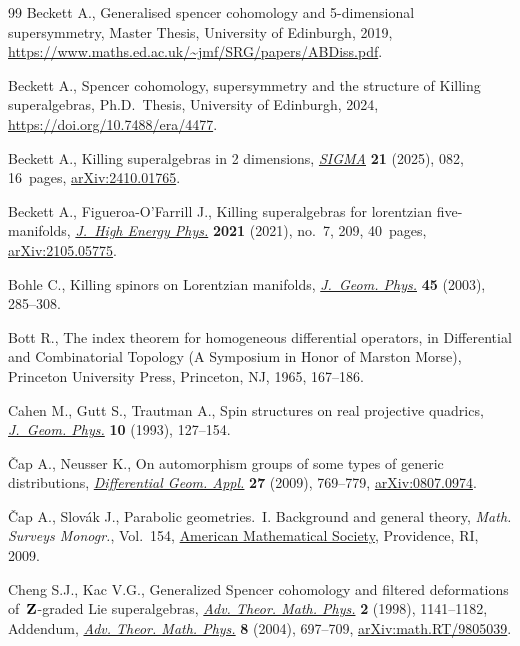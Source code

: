 \documentclass[10pt,a4paper]{amsart}
\numberwithin{equation}{section}
\newcommand{\1}{\mathbbm{1}}
\begin{document}
\begin{thebibliography}{99}
Beckett A., Generalised spencer cohomology and 5-dimensional supersymmetry,
 {M}aster Thesis, {U}niversity of Edinburgh, 2019,
 \url{https://www.maths.ed.ac.uk/~jmf/SRG/papers/ABDiss.pdf}.

Beckett A., Spencer cohomology, supersymmetry and the structure of {K}illing
 superalgebras, Ph.D.~Thesis, {U}niversity of Edinburgh, 2024,
 \url{https://doi.org/10.7488/era/4477}.

Beckett A., Killing superalgebras in 2 dimensions,
 \href{https://doi.org/10.3842/SIGMA.2025.082}{\textit{SIGMA}} \textbf{21}
 (2025), 082, 16~pages,
 \href{http://arxiv.org/abs/2410.01765}{arXiv:2410.01765}.

Beckett A., Figueroa-O'Farrill J., Killing superalgebras for lorentzian
 five-manifolds,
 \href{https://doi.org/10.1007/jhep07(2021)209}{\textit{J.~High Energy Phys.}}
 \textbf{2021} (2021), no.~7, 209, 40~pages,
 \href{http://arxiv.org/abs/2105.05775}{arXiv:2105.05775}.

Bohle C., Killing spinors on {L}orentzian manifolds,
 \href{https://doi.org/10.1016/S0393-0440(01)00047-X}{\textit{J.~Geom. Phys.}}
 \textbf{45} (2003), 285--308.

Bott R., The index theorem for homogeneous differential operators, in
 Differential and {C}ombinatorial {T}opology ({A} {S}ymposium in {H}onor of
 {M}arston {M}orse), Princeton University Press, Princeton, NJ, 1965,
 167--186.

Cahen M., Gutt S., Trautman A., Spin structures on real projective quadrics,
 \href{https://doi.org/10.1016/0393-0440(93)90025-A}{\textit{J.~Geom. Phys.}}
 \textbf{10} (1993), 127--154.

{\v{C}}ap A., Neusser K., On automorphism groups of some types of generic
 distributions,
 \href{https://doi.org/10.1016/j.difgeo.2009.05.003}{\textit{Differential
 Geom. Appl.}} \textbf{27} (2009), 769--779,
 \href{http://arxiv.org/abs/0807.0974}{arXiv:0807.0974}.

{\v{C}}ap A., Slov\'{a}k J., Parabolic geometries.~{I}. Background and general
 theory, \textit{Math. Surveys Monogr.}, Vol.~154,
 \href{https://doi.org/10.1090/surv/154}{American Mathematical Society},
 Providence, RI, 2009.

Cheng S.J., Kac V.G., Generalized {S}pencer cohomology and filtered
 deformations of~{${\bf Z}$}-graded {L}ie superalgebras,
 \href{https://doi.org/10.4310/ATMP.1998.v2.n5.a7}{\textit{Adv. Theor. Math.
 Phys.}} \textbf{2} (1998), 1141--1182, {A}ddendum,
 \href{https://doi.org/10.4310/ATMP.2004.v8.n4.a2}{\textit{Adv. Theor. Math.
 Phys.}} \textbf{8} (2004), 697--709,
 \href{http://arxiv.org/abs/math.RT/9805039}{arXiv:math.RT/9805039}.


\end{thebibliography}
\end{document}
